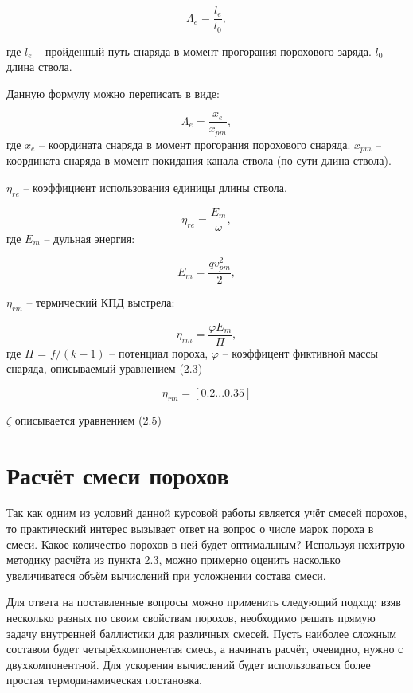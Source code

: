 \documentclass[14pt, a4paper]{extreport} %
\begin{document}
\[
\Lambda_e = \frac{l_e}{l_0},
\]

где \( l_e \) -- пройденный путь снаряда в момент прогорания порохового заряда.  \( l_0 \) -- длина ствола. 

Данную формулу можно переписать в виде:

\begin{equation}
\Lambda_e = \frac{x_e}{x_{pm}},
\end{equation}
где \( x_e \) -- координата снаряда в момент прогорания порохового снаряда. \( x_{pm} \) -- координата снаряда в момент покидания канала ствола (по сути длина ствола).

\( \eta_{re} \) -- коэффициент использования единицы длины ствола.

\begin{equation}
\eta_{re} = \frac{E_m}{\omega},
\end{equation}
где \( E_m \) -- дульная энергия: 

\begin{equation}
E_m = \frac{qv_{pm}^2}{2},
\end{equation}

\( \eta_{rm} \) -- термический КПД выстрела:

\begin{equation}
\eta_{rm} = \frac{\varphi E_m }{\Pi},
\end{equation}
где \( \Pi \) = \(  f/(k-1) \) -- потенциал пороха, $\varphi$ -- коэффицент фиктивной массы снаряда, описываемый уравнением (2.3)

\[
 \eta_{rm} = [0.2...0.35]
\]

\( \zeta \) описывается уравнением (2.5)

\section{Расчёт смеси порохов}

Так как одним из условий данной курсовой работы является учёт смесей порохов, то практический интерес вызывает ответ на вопрос о числе марок пороха в смеси. Какое количество порохов в ней будет оптимальным?
Используя нехитрую методику расчёта из пункта 2.3, можно примерно оценить насколько увеличиватеся объём вычислений при усложнении состава смеси. 

Для ответа на поставленные вопросы можно применить следующий подход: взяв несколько разных по своим свойствам порохов, необходимо решать прямую задачу внутренней баллистики 
для различных смесей. Пусть наиболее сложным составом будет четырёхкомпонентая смесь, а начинать расчёт, очевидно, нужно с двухкомпонентной. Для ускорения вычислений будет использоваться более простая термодинамическая постановка.
\end{document}
